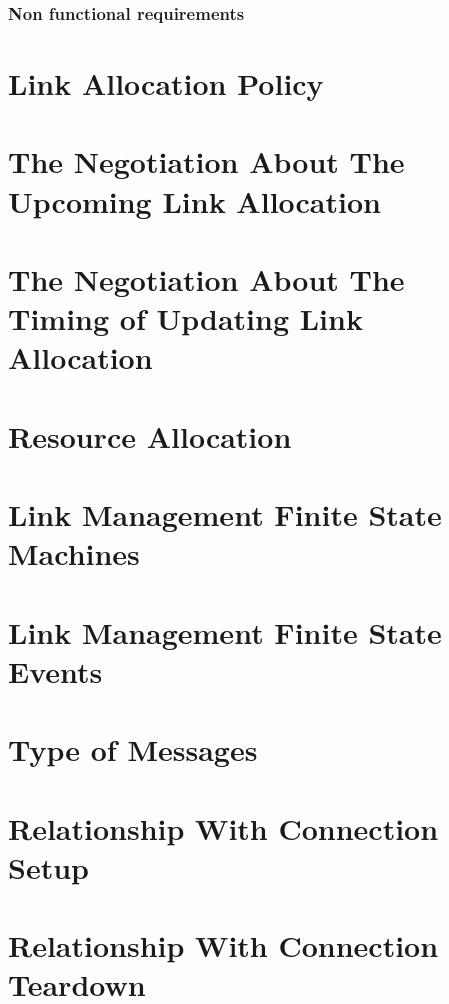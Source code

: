 \subsubsection{Non functional requirements}

\section{Link Allocation Policy}
\section{The Negotiation About The Upcoming Link Allocation}
\section{The Negotiation About The Timing of Updating Link Allocation}
\section{Resource Allocation }
\section{Link Management Finite State Machines}
\section{Link Management Finite State Events}
\section{Type of Messages}
\section{Relationship With Connection Setup}
\section{Relationship With Connection Teardown}

